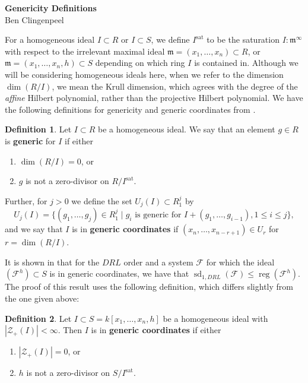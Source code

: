 \documentclass[11pt]{article}
\newcommand{\F}{\mathcal{F}}
\newcommand{\sat}{^{\text{sat}}}
\DeclareMathOperator{\sd}{sd}
\DeclareMathOperator{\reg}{reg}
\theoremstyle{definition}
\newtheorem{definition}{Definition}
\begin{document}
\begin{center}
	\Huge{\textbf{Genericity Definitions}}\\
	\vspace{.5em}
	\normalsize{Ben Clingenpeel}
\end{center}

For a homogeneous ideal $I \subset R$ or $I \subset S$, we define $I\sat$ to be the saturation $I:\mathfrak{m}^\infty$ with respect to the irrelevant maximal ideal $\mathfrak{m} = (x_1, \dots, x_n) \subset R$, or $\mathfrak{m} = (x_1, \dots, x_n, h) \subset S$ depending on which ring $I$ is contained in. Although we will be considering homogeneous ideals here, when we refer to the dimension $\dim(R/I)$, we mean the Krull dimension, which agrees with the degree of the \emph{affine} Hilbert polynomial, rather than the projective Hilbert polynomial. We have the following definitions for genericity and generic coordinates from \cite{bayer1987criterion}. 


\begin{definition}\label{def:genA}
	Let $I \subset R$ be a homogeneous ideal. We say that an element $g \in R$ is \textbf{generic} for $I$ if either \begin{enumerate}[noitemsep, label = (\arabic*)]
		\item $\dim(R/I) = 0$, or
		\item $g$ is not a zero-divisor on $R/I\sat$. 
	\end{enumerate} Further, for $j > 0$ we define the set $U_j(I) \subset R_1^j$ by \[ U_j(I) = \{(g_1, \dots, g_j) \in R_1^j \mid g_i \text{ is generic for } I + (g_1, \dots, g_{i - 1}), 1 \leq i \leq j\}, \] and we say that $I$ is in \textbf{generic coordinates} if $(x_n, \dots, x_{n - r + 1}) \in U_r$ for $r = \dim(R/I)$. 
\end{definition}


It is shown in \cite{caminata2020solving} that for the $DRL$ order and a system $\F$ for which the ideal $(\F^h) \subset S$ is in generic coordinates, we have that $\sd_{1,DRL}(\F) \leq \reg(\F^h)$. The proof of this result uses the following definition, which differs slightly from the one given above:


\begin{definition}\label{def:genB}
	Let $I \subset S = k[x_1, \dots, x_n, h]$ be a homogeneous ideal with $|\mathcal{Z}_+(I)| < \infty$. Then $I$ is in \textbf{generic coordinates} if either \begin{enumerate}[noitemsep, label = (\roman*)]
		\item $|\mathcal{Z}_+(I)| = 0$, or
		\item $h$ is not a zero-divisor on $S/I\sat$. 
	\end{enumerate}
\end{definition}
\end{document}

